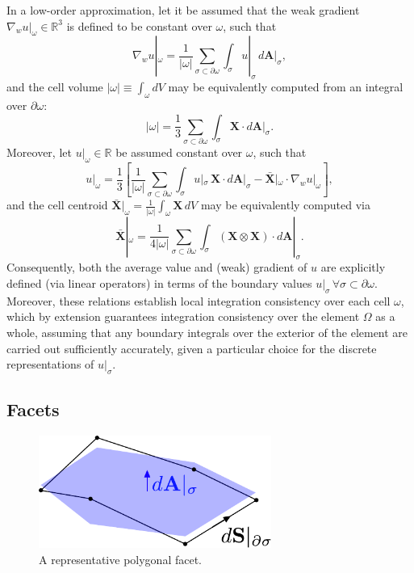 \documentclass[10pt,a4paper]{article}
\begin{document}
In a low-order approximation, let it be assumed that the weak gradient $\nabla_{w} u |_{\omega} \in \mathbb{R}^3$ is defined to be constant over $\omega$, such that
\begin{equation}
  \nabla_{w} u |_{\omega} = \frac{1}{|\omega|} \sum_{\sigma \subset \partial \omega} \int_{\sigma} u |_{\sigma} \, d\mathbf{A} |_\sigma,
\end{equation}
and the cell volume $|\omega| \equiv \int_{\omega} dV$ may be equivalently computed from an integral over $\partial \omega$:
\begin{equation}
  |\omega| = \frac{1}{3} \sum_{\sigma \subset \partial \omega} \int_{\sigma} \mathbf{X} \cdot d\mathbf{A} |_\sigma.
\end{equation}
Moreover, let $u |_{\omega} \in \mathbb{R}$ be assumed constant over $\omega$, such that
\begin{equation}
	u |_{\omega} = \frac{1}{3} \left[ \frac{1}{| \omega |} \sum_{\sigma \subset \partial \omega} \int_{\sigma} u |_{\sigma} \, \mathbf{X} \cdot d\mathbf{A} |_\sigma - \bar{\mathbf{X}} |_{\omega} \cdot \nabla_{w} u |_{\omega} \right],
\end{equation}
and the cell centroid $\bar{\mathbf{X}} |_{\omega} = \frac{1}{|\omega|} \int_{\omega} \mathbf{X} \, dV$ may be equivalently computed via
\begin{equation}
	 \bar{\mathbf{X}} |_{\omega} = \frac{1}{4 | \omega |} \sum_{\sigma \subset \partial \omega} \int_{\sigma} (\mathbf{X} \otimes \mathbf{X}) \cdot d\mathbf{A} |_\sigma .
\end{equation}
Consequently, both the average value and (weak) gradient of $u$ are explicitly defined (via linear operators) in terms of the boundary values $u |_{\sigma} \, \forall \sigma \subset \partial \omega$. Moreover, these relations establish local integration consistency over each cell $\omega$, which by extension guarantees integration consistency over the element $\Omega$ as a whole, assuming that any boundary integrals over the exterior of the element are carried out sufficiently accurately, given a particular choice for the discrete representations of $u |_{\sigma}$.

\subsection{Facets}

\begin{figure} [!ht]
	\centering
	\includegraphics[width = 3.0in]{figures/facet.pdf}
	\caption{A representative polygonal facet.}
	\label{fig:facet}
\end{figure}
\end{document}
